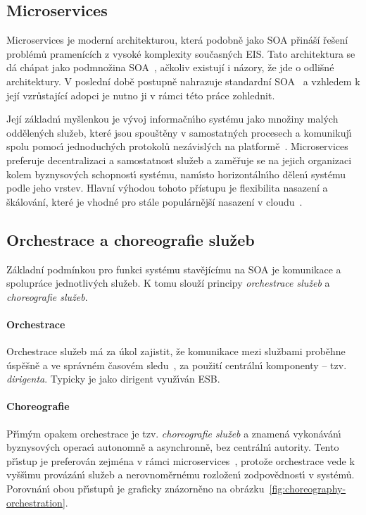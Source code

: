 \subsection{Microservices}\label{sec:microservices}

Microservices je moderní architekturou, která podobně jako \gls{SOA} přináší řešení
problémů pramenících z vysoké komplexity současných \gls{EIS}.
Tato architektura se dá chápat jako podmnožina \gls{SOA}~\cite{cerny2017disambiguation, richards2015microservices},
ačkoliv existují i názory, že jde o odlišné architektury. V poslední době postupně nahrazuje standardní
\gls{SOA}~\cite{lewis2014microservices, xiao2016reflections} a vzhledem k její vzrůstající
adopci je nutno ji v rámci této práce zohlednit.

Její základn\'{\i} myšlenkou je v\'yvoj informačn\'{\i}ho systému jako množiny mal\'ych oddělen\'ych služeb,
které jsou spouštěny v samostatn\'ych procesech a komunikuj\'{\i} spolu pomoc\'{\i} jednoduch\'ych
protokolů nezávislých na platformě~\cite{lewis2014microservices}. Microservices preferuje decentralizaci a samostatnost služeb
a zaměřuje se na jejich organizaci kolem byznysov\'ych schopnost\'{\i} systému, nam\'{\i}sto horizontáln\'{\i}ho
dělen\'{\i} systému podle jeho vrstev. Hlavní výhodou tohoto přístupu je flexibilita nasazení a škálování, které je vhodné
pro stále populárnější nasazení v cloudu~\cite{cerny2018contextual, kratzke2017understanding, xiao2016reflections}.

\subsection{Orchestrace a choreografie služeb}

Základní podmínkou pro funkci systému stavějícímu na \gls{SOA} je komunikace a spolupráce jednotlivých služeb.
K tomu slouží principy \textit{orchestrace služeb} a \textit{choreografie služeb}.

\paragraph{Orchestrace}
Orchestrace služeb má za úkol zajistit, že komunikace mezi službami
proběhne úspěšně a ve správném časovém sledu~\cite{orchestration},
za použití centráln\'{\i} komponenty -- tzv. \textit{dirigenta}.
Typicky je jako dirigent využ\'{\i}ván \gls{ESB}.

\paragraph{Choreografie}
Př\'{\i}m\'ym opakem orchestrace je tzv. \textit{choreografie služeb} a znamená
vykonáván\'{\i} byznysov\'ych operac\'{\i} autonomně a asynchronně, bez centráln\'{\i}
autority. Tento př\'{\i}stup je preferován zejména v rámci microservices~\cite{dragoni2017microservices},
protože orchestrace vede k vyšš\'{\i}mu provázán\'{\i} služeb a nerovnoměrnému rozložen\'{\i}
zodpovědnost\'{\i} v systémů. Porovnán\'{\i} obou př\'{\i}stupů je graficky
znázorněno na obrázku~\ref{fig:choreography-orchestration}.

